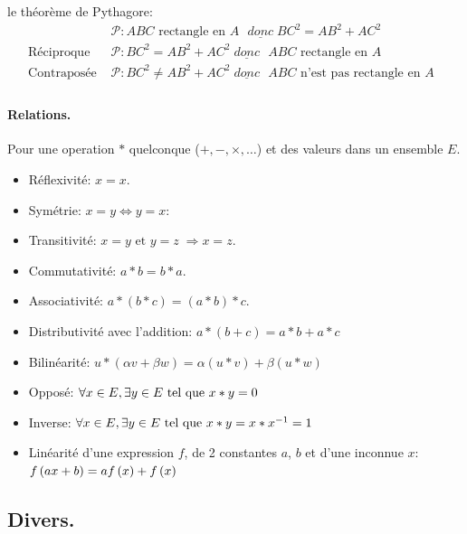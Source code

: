 \documentclass[12pt]{article}
\begin{document}
\Ex le théorème de Pythagore: $$
\begin{aligned}
                        &\mathcal{P}: 
        \text{$ABC$ rectangle en $A$ } 
        \underline{donc} \; BC^2 = AB^2 + AC^2 \\
    \text{Réciproque }  &\mathcal{P}: 
        BC^2 = AB^2 + AC^2 \;
        \underline{donc} \text{ $ABC$ rectangle en $A$ } \\
    \text{Contraposée } &\mathcal{P}: 
        BC^2 \neq AB^2 + AC^2 \;
        \underline{donc} \text{ $ABC$ n'est pas rectangle en $A$ } \\
\end{aligned} $$ 

\paragraph{Relations.} Pour une operation $*$ quelconque ($+, -, \times, \dots$)
et des valeurs dans un ensemble $E$.
\begin{itemize}
    \item[\Il] Réflexivité: $x = x$.
    \item[\Il] Symétrie: $x = y \iff y = x$:
    \item[\Il] Transitivité: $
        x = y \text{ et } y = z \;
        \Rightarrow x = z 
    $.
    \item Commutativité: $a \ast b = b \ast a$.
    \item Associativité: $a \ast (b \ast c) = (a \ast b) \ast c$.
    \item Distributivité avec l'addition: $
          a \ast (b + c) 
        = a \ast b + a \ast c
    $
    \item Bilinéarité: $
          u \ast (\alpha v + \beta w) 
        = \alpha (u \ast v) + \beta (u \ast w)
    $

    \item Opposé: $\forall x \in E, \exists y \in E
        \text{ tel que } x * y = 0$
    \item[\Ii] Inverse: $\forall x \in E, \exists y \in E
        \text{ tel que } x * y = x * x^{-1} = 1 $
    \item[\Ii] Linéarité d'une expression $f$, de 2 constantes $a$, $b$ 
    et d'une inconnue $x$: $f\left(ax + b\right) = af\left(x\right) + f\left(x\right)$
\end{itemize}


\subsection{Divers.}
\end{document}
